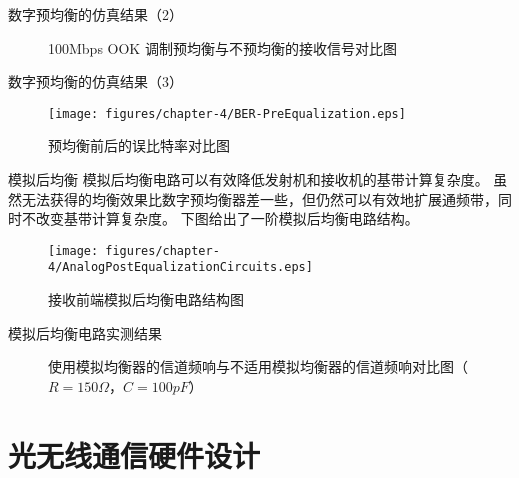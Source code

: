 \documentclass[mathserif, utf8, 9pt]{beamer}
\begin{document}
\begin{frame}{数字预均衡的仿真结果（2）}
    \begin{figure}[htbp]
        \centering
        \caption{100Mbps OOK 调制预均衡与不预均衡的接收信号对比图}
    \end{figure}
\end{frame}

\begin{frame}{数字预均衡的仿真结果（3）}
    \begin{figure}[htbp]
    \centering
	\texttt{[image: figures/chapter-4/BER-PreEqualization.eps]}
	\caption{预均衡前后的误比特率对比图}
\end{figure}
\end{frame}

\begin{frame}{模拟后均衡}
    模拟后均衡电路可以有效降低发射机和接收机的基带计算复杂度。
    虽然无法获得的均衡效果比数字预均衡器差一些，但仍然可以有效地扩展通频带，同时不改变基带计算复杂度。
    下图给出了一阶模拟后均衡电路结构。
    \begin{figure}[htbp]
        \centering
    	\texttt{[image: figures/chapter-4/AnalogPostEqualizationCircuits.eps]}
    	\caption{接收前端模拟后均衡电路结构图}
    \end{figure}
\end{frame}

\begin{frame}{模拟后均衡电路实测结果}
    \begin{figure}[htbp]
    \centering
    \caption{使用模拟均衡器的信道频响与不适用模拟均衡器的信道频响对比图（\alert{$R = 150\Omega$，$C = 100pF$}）}
\end{figure}
\end{frame}

\section{光无线通信硬件设计}
\end{document}
